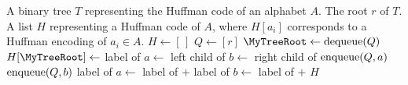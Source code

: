 
\begin{algorithmic}[1]
\Require A binary tree $T$ representing the Huffman code of an alphabet
  $A$. The root $r$ of $T$.
\Ensure A list $H$ representing a Huffman code of $A$, where $H[a_i]$
  corresponds to a Huffman encoding of $a_i \in A$.
\State $H \gets [\,]$
\State $Q \gets [r]$
  \State $\MyTreeRoot \gets \dequeue(Q)$
    \State $H[\MyTreeRoot] \gets$ label of \MyTreeRoot
  \Else
    \State $a \gets$ left child of \MyTreeRoot
    \State $b \gets$ right child of \MyTreeRoot
    \State $\operatorname*{enqueue}(Q, a)$
    \State $\operatorname*{enqueue}(Q, b)$
    \State label of $a \gets$ label of \MyTreeRoot $+$ \MyZero
    \State label of $b \gets$ label of \MyTreeRoot $+$ \MyOne
  \EndIf
\EndWhile
\State \Return $H$
\end{algorithmic}
